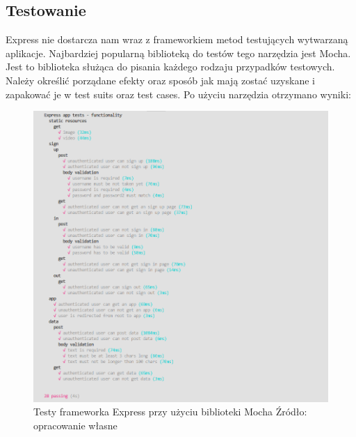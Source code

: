 \documentclass[12pt]{report}
\begin{document}
    \subsection{Testowanie}
      Express nie dostarcza nam wraz z frameworkiem metod testujących wytwarzaną aplikacje. 
      Najbardziej popularną biblioteką do testów tego narzędzia jest Mocha.
      Jest to biblioteka służąca do pisania każdego rodzaju przypadków testowych.
      Należy określić porządane efekty oraz sposób jak mają zostać uzyskane i zapakować je w test suits oraz test cases.
      Po użyciu narzędzia otrzymano wyniki:
      \begin{figure}[!hb]
        \centering
        \includegraphics[width=\textwidth,height=\textheight,keepaspectratio]{test_express.png} 
        \caption{Testy frameworka Express przy użyciu biblioteki Mocha \newline Źródło: opracowanie własne}
      \end{figure}
\end{document}
